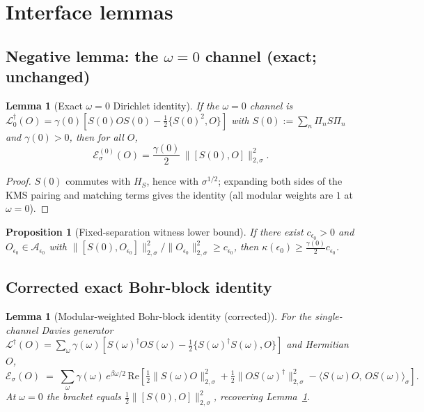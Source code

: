 \documentclass[11pt,a4paper]{article}
\theoremstyle{plain}
\newtheorem{lemma}[theorem]{Lemma}
\newtheorem{proposition}[theorem]{Proposition}
\theoremstyle{definition}
\theoremstyle{remark}
\newcommand{\eps}{\epsilon}
\newcommand{\normsig}[1]{\lVert #1 \rVert_{2,\sigma}}
\begin{document}
\section{Interface lemmas}

\subsection{Negative lemma: the $\omega = 0$ channel (exact; unchanged)}

\begin{lemma}[Exact $\omega = 0$ Dirichlet identity]\label{lem:zero}
If the $\omega = 0$ channel is $\mathcal{L}^\dagger_0(O) =
\gamma(0)[S(0)OS(0) - \tfrac12\{S(0)^2, O\}]$ with $S(0) := \sum_n \Pi_n S
\Pi_n$ and $\gamma(0) > 0$, then for all $O$,
\begin{equation}
\mathcal{E}^{(0)}_\sigma(O) = \frac{\gamma(0)}{2}\,\normsig{[S(0), O]}^2 .
\end{equation}
\end{lemma}

\begin{proof}
$S(0)$ commutes with $H_S$, hence with $\sigma^{1/2}$; expanding both sides
of the KMS pairing and matching terms gives the identity (all modular weights
are $1$ at $\omega = 0$).
\end{proof}

\begin{proposition}[Fixed-separation witness lower bound]\label{prop:witness}
If there exist $c_{\eps_0} > 0$ and $O_{\eps_0}\in\mathcal{A}_{\eps_0}$ with
$\normsig{[S(0), O_{\eps_0}]}^2/\normsig{O_{\eps_0}}^2 \ge c_{\eps_0}$, then
$\kappa(\eps_0) \ge \tfrac{\gamma(0)}{2}c_{\eps_0}$.
\end{proposition}

\subsection{Corrected exact Bohr-block identity}

\begin{lemma}[Modular-weighted Bohr-block identity (corrected)]
\label{lem:blocks}
For the single-channel Davies generator $\mathcal{L}^\dagger(O) =
\sum_\omega \gamma(\omega)[S(\omega)^\dagger O S(\omega) -
\tfrac12\{S(\omega)^\dagger S(\omega), O\}]$ and Hermitian $O$,
\begin{equation}\label{eq:blocks}
\mathcal{E}_\sigma(O) \;=\; \sum_\omega \gamma(\omega)\, e^{\beta\omega/2}\,
\mathrm{Re}\!\left[\tfrac12\normsig{S(\omega)O}^2 +
\tfrac12\normsig{OS(\omega)^\dagger}^2 -
\big\langle S(\omega)O,\, OS(\omega)\big\rangle_\sigma\right].
\end{equation}
At $\omega = 0$ the bracket equals $\tfrac12\normsig{[S(0),O]}^2$, recovering
Lemma~\ref{lem:zero}.
\end{lemma}
\end{document}
